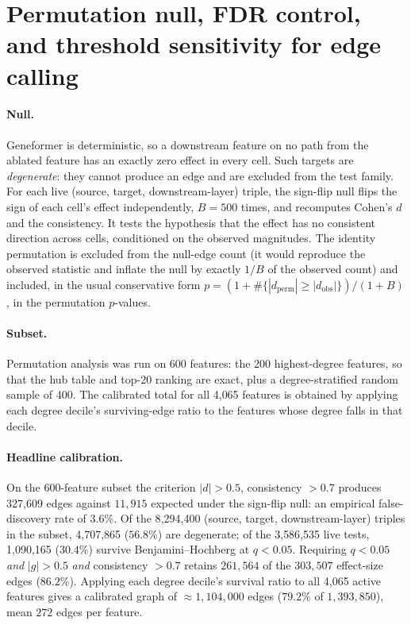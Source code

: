 \documentclass[10pt,letterpaper]{article}
\begin{document}
\section{Permutation null, FDR control, and threshold sensitivity for edge calling}
\label{supp:calibration}

\paragraph{Null.} Geneformer is deterministic, so a downstream feature on no path from the ablated feature has an exactly zero effect in every cell. Such targets are \emph{degenerate}: they cannot produce an edge and are excluded from the test family. For each live (source, target, downstream-layer) triple, the sign-flip null flips the sign of each cell's effect independently, $B=500$ times, and recomputes Cohen's $d$ and the consistency. It tests the hypothesis that the effect has no consistent direction across cells, conditioned on the observed magnitudes. The identity permutation is excluded from the null-edge count (it would reproduce the observed statistic and inflate the null by exactly $1/B$ of the observed count) and included, in the usual conservative form $p = (1+\#\{|d_\mathrm{perm}|\ge|d_\mathrm{obs}|\})/(1+B)$, in the permutation $p$-values.

\paragraph{Subset.} Permutation analysis was run on 600 features: the 200 highest-degree features, so that the hub table and top-20 ranking are exact, plus a degree-stratified random sample of 400. The calibrated total for all 4{,}065 features is obtained by applying each degree decile's surviving-edge ratio to the features whose degree falls in that decile.

\paragraph{Headline calibration.} On the 600-feature subset the criterion $|d|>0.5$, consistency $>0.7$ produces 327{,}609 edges against $11{,}915$ expected under the sign-flip null: an empirical false-discovery rate of $\mathbf{3.6\%}$. Of the 8{,}294{,}400 (source, target, downstream-layer) triples in the subset, 4{,}707{,}865 ($56.8\%$) are degenerate; of the 3{,}586{,}535 live tests, 1{,}090{,}165 ($30.4\%$) survive Benjamini--Hochberg at $q<0.05$. Requiring $q<0.05$ \emph{and} $|g|>0.5$ \emph{and} consistency $>0.7$ retains $261{,}564$ of the $303{,}507$ effect-size edges ($\mathbf{86.2\%}$). Applying each degree decile's survival ratio to all 4{,}065 active features gives a calibrated graph of $\approx 1{,}104{,}000$ edges ($79.2\%$ of $1{,}393{,}850$), mean $272$ edges per feature.
\end{document}
